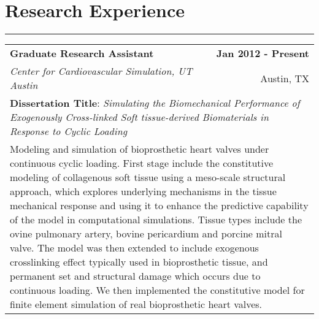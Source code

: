 \documentclass[11pt]{article}
\begin{document}






\section{Research Experience}
\hrule
\normalsize

\vspace{1em}

\begin{tabularx}{0.965\textwidth}{X r}
  \textbf{Graduate Research Assistant} & \textbf{Jan 2012 - Present} \\
  \textit{Center for Cardiovascular Simulation, UT Austin} & Austin, TX \\
  \multicolumn{2}{p{\dimexpr0.965\textwidth-2\tabcolsep-2\arrayrulewidth}}{\textbf{Dissertation Title}: \textit{Simulating the Biomechanical Performance of Exogenously Cross-linked 
Soft tissue-derived Biomaterials in Response to Cyclic Loading}
}\\
 \multicolumn{2}{p{\dimexpr0.965\textwidth-2\tabcolsep-2\arrayrulewidth}}{Modeling and simulation of bioprosthetic heart valves under continuous cyclic loading. First stage include the constitutive modeling of collagenous soft tissue using a meso-scale structural approach, which explores underlying mechanisms in the tissue mechanical response and using it to enhance the predictive capability of the model in computational simulations. Tissue types include the ovine pulmonary artery, bovine pericardium and porcine mitral valve. The model was then extended to include exogenous crosslinking effect typically used in bioprosthetic tissue, and permanent set and structural damage which occurs due to continuous loading. We then implemented the constitutive model for finite element simulation of real bioprosthetic heart valves.
}\\
\end{tabularx}

\vspace{1em}
\end{document}
